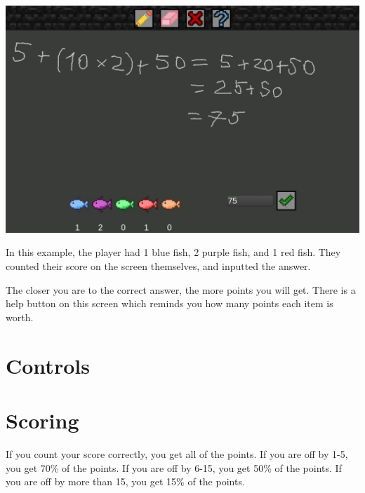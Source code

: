 \documentclass[12pt]{book}
\begin{document}
		\includegraphics[width=\textwidth]{Counting}

		In this example, the player had 1 blue fish, 2 purple fish, and 1 red fish. They counted their score on the screen themselves, and inputted the answer.

		The closer you are to the correct answer, the more points you will get. There is a help button on this screen which reminds you how many points each item is worth.
		\section{Controls}
		\section{Scoring}
			If you count your score correctly, you get all of the points. If you are off by 1-5, you get 70\% of the points. If you are off by 6-15, you get 50\% of the points. If you are off by more than 15, you get 15\% of the points.
\end{document}
